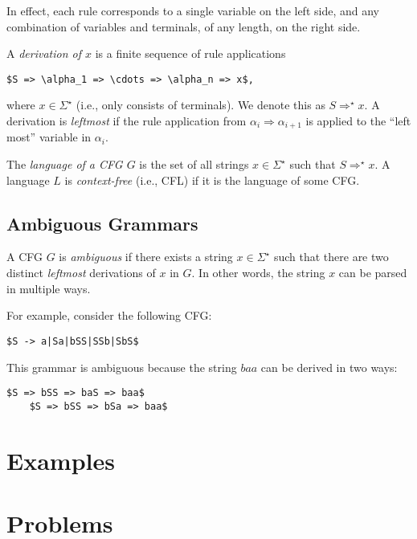 In effect, each rule corresponds to a single variable on the left side, and any combination of variables and terminals, of any length, on the right side.

A \emph{derivation of $x$} is a finite sequence of rule applications
\begin{lstlisting}[mathescape]
	$S => \alpha_1 => \cdots => \alpha_n => x$,
\end{lstlisting}
where $x \in \Sigma^\star$ (i.e., only consists of terminals).
We denote this as $S \Rightarrow^\star x$.
A derivation is \emph{leftmost} if the rule application from $\alpha_i \Rightarrow \alpha_{i+1}$ is applied to the ``left most'' variable in $\alpha_i$.

The \emph{language of a CFG $G$} is the set of all strings $x \in \Sigma^\star$ such that $S \Rightarrow^\star x$.
A language $L$ is \emph{context-free} (i.e., CFL) if it is the language of some CFG.

\subsection{Ambiguous Grammars}

A CFG $G$ is \emph{ambiguous} if there exists a string $x \in \Sigma^\star$ such that there are two distinct \emph{leftmost} derivations of $x$ in $G$.
In other words, the string $x$ can be parsed in multiple ways. 

For example, consider the following CFG:
\begin{lstlisting}[mathescape]
	$S -> a|Sa|bSS|SSb|SbS$
\end{lstlisting}

This grammar is ambiguous because the string $baa$ can be derived in two ways:
\begin{lstlisting}[mathescape]
	$S => bSS => baS => baa$
	$S => bSS => bSa => baa$
\end{lstlisting}

\section{Examples}

\section{Problems}